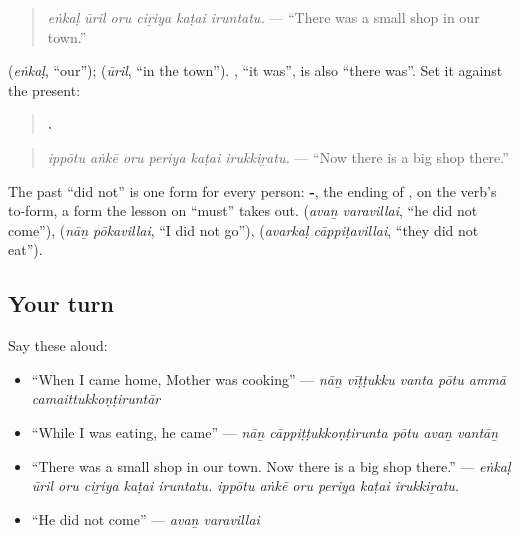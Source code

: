 \begin{quote}
\emph{eṅkaḷ ūril oru ciṟiya kaṭai iruntatu.} — \textquotedblleft{}There was a small shop in our town.\textquotedblright{}
\end{quote}

\textbf{} (\emph{eṅkaḷ}, \textquotedblleft{}our\textquotedblright{}); \textbf{} (\emph{ūril}, \textquotedblleft{}in the town\textquotedblright{}). \textbf{}, \textquotedblleft{}it was\textquotedblright{}, is also \textquotedblleft{}there was\textquotedblright{}. Set it against the present:

\begin{quote}
\textbf{     .}
\end{quote}

\begin{quote}
\emph{ippōtu aṅkē oru periya kaṭai irukkiṟatu.} — \textquotedblleft{}Now there is a big shop there.\textquotedblright{}
\end{quote}

The past \textquotedblleft{}did not\textquotedblright{} is one form for every person: \textbf{-}, the ending of \textbf{}, on the verb's to-form, a form the lesson on \textquotedblleft{}must\textquotedblright{} takes out. \textbf{ } (\emph{avaṉ varavillai}, \textquotedblleft{}he did not come\textquotedblright{}), \textbf{ } (\emph{nāṉ pōkavillai}, \textquotedblleft{}I did not go\textquotedblright{}), \textbf{ } (\emph{avarkaḷ cāppiṭavillai}, \textquotedblleft{}they did not eat\textquotedblright{}).

\subsection*{Your turn}
Say these aloud:

\begin{itemize}
\raggedright
  \item \textquotedblleft{}When I came home, Mother was cooking\textquotedblright{} — \emph{nāṉ vīṭṭukku vanta pōtu ammā camaittukkoṇṭiruntār}
  \item \textquotedblleft{}While I was eating, he came\textquotedblright{} — \emph{nāṉ cāppiṭṭukkoṇṭirunta pōtu avaṉ vantāṉ}
  \item \textquotedblleft{}There was a small shop in our town. Now there is a big shop there.\textquotedblright{} — \emph{eṅkaḷ ūril oru ciṟiya kaṭai iruntatu. ippōtu aṅkē oru periya kaṭai irukkiṟatu.}
  \item \textquotedblleft{}He did not come\textquotedblright{} — \emph{avaṉ varavillai}
\end{itemize}


